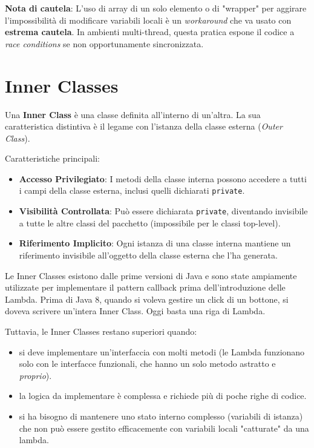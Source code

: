 \begin{warningbox}
\textbf{Nota di cautela}: L'uso di array di un solo elemento o di "wrapper" per aggirare l'impossibilità di modificare variabili locali è un \textit{workaround} che va usato con \textbf{estrema cautela}. In ambienti multi-thread, questa pratica espone il codice a \textit{race conditions} se non opportunamente sincronizzata.
\end{warningbox}


\section{Inner Classes}

Una \textbf{Inner Class} è una classe definita all'interno di un'altra. La sua caratteristica distintiva è il legame con l'istanza della classe esterna (\textit{Outer Class}).

Caratteristiche principali:
\begin{itemize}
    \item \textbf{Accesso Privilegiato}: I metodi della classe interna possono accedere a tutti i campi della classe esterna, inclusi quelli dichiarati \texttt{private}.
    \item \textbf{Visibilità Controllata}: Può essere dichiarata \texttt{private}, diventando invisibile a tutte le altre classi del pacchetto (impossibile per le classi top-level).
    \item \textbf{Riferimento Implicito}: Ogni istanza di una classe interna mantiene un riferimento invisibile all'oggetto della classe esterna che l'ha generata.
\end{itemize}
\vspace{\baselineskip}

Le Inner Classes esistono dalle prime versioni di Java e sono state ampiamente utilizzate per implementare il pattern callback prima dell'introduzione delle Lambda.
Prima di Java 8, quando si voleva gestire un click di un bottone, si doveva scrivere un'intera Inner Class. Oggi basta una riga di Lambda.

Tuttavia, le Inner Classes restano superiori quando:
\begin{itemize}
    \item si deve implementare un'interfaccia con molti metodi (le Lambda funzionano solo con le interfacce funzionali, che hanno un solo metodo astratto e \textit{proprio}).
    \item la logica da implementare è complessa e richiede più di poche righe di codice.
    \item si ha bisogno di mantenere uno stato interno complesso (variabili di istanza) che non può essere gestito efficacemente con variabili locali "catturate" da una lambda.
\end{itemize}


